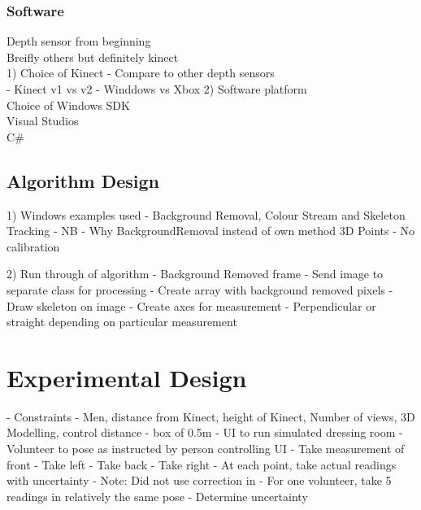\subsubsection{Software}
Depth sensor from beginning\\
Breifly others but definitely kinect\\ 
1) Choice of Kinect - Compare to other depth sensors\\
- Kinect v1 vs v2
- Winddows vs Xbox
2) Software platform\\ 
Choice of Windows SDK\\
Visual Studios\\
C#\\

\subsection{Algorithm Design}
1) Windows examples used - Background Removal, Colour Stream and Skeleton Tracking - NB - Why BackgroundRemoval instead of own method
3D Points - No calibration

2) Run through of algorithm
- Background Removed frame
- Send image to separate class for processing
- Create array with background removed pixels
- Draw skeleton on image
- Create axes for measurement - Perpendicular or straight depending on particular measurement

\section{Experimental Design}
- Constraints - Men, distance from Kinect, height of Kinect, Number of views, 3D Modelling, control distance - box of 0.5m
- UI to run simulated dressing room
- Volunteer to pose as instructed by person controlling UI
- Take measurement of front
- Take left
- Take back
- Take right 
- At each point, take actual readings with uncertainty
- Note: Did not use correction in \cite{nonContact2017}
- For one volunteer, take 5 readings in relatively the same pose - Determine uncertainty 